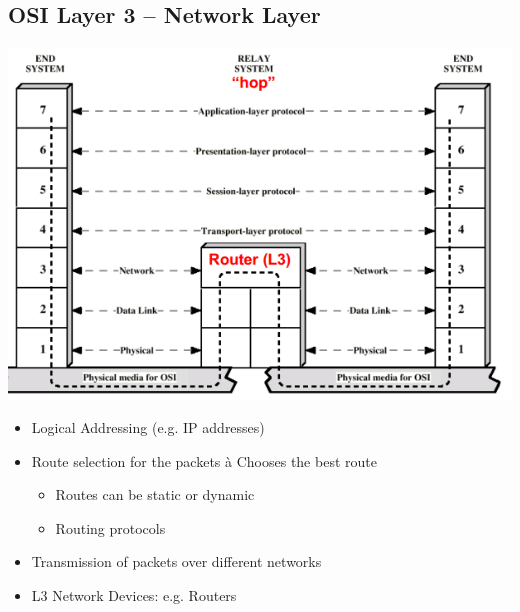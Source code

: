 \documentclass[11pt]{article}
\begin{document}
\subsection{OSI Layer 3 – Network Layer}
\includegraphics[width=\textwidth]{osi-3-network-layer}
\begin{itemize}
    \item Logical Addressing (e.g. IP addresses)
    \item Route selection for the packets à Chooses the best route
    \begin{itemize}
        \item Routes can be static or dynamic
        \item Routing protocols
    \end{itemize}
    \item Transmission of packets over different networks
    \item L3 Network Devices: e.g. Routers
\end{itemize}
\end{document}

